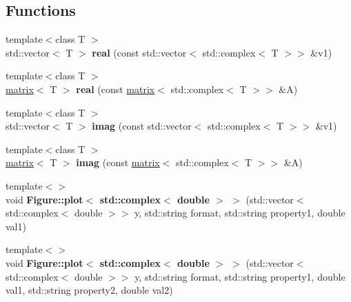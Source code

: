 \subsection*{Functions}
\begin{DoxyCompactItemize}
\item 
\hypertarget{namespacekeycpp_aa6ed5914a3c4b05e1e137fc9735e3ed5}{{\footnotesize template$<$class T $>$ }\\std\-::vector$<$ T $>$ {\bfseries real} (const std\-::vector$<$ std\-::complex$<$ T $>$$>$ \&v1)}\label{namespacekeycpp_aa6ed5914a3c4b05e1e137fc9735e3ed5}

\item 
\hypertarget{namespacekeycpp_a61efb014b42cd8b02a81b4520c41ab2c}{{\footnotesize template$<$class T $>$ }\\\hyperlink{classkeycpp_1_1matrix}{matrix}$<$ T $>$ {\bfseries real} (const \hyperlink{classkeycpp_1_1matrix}{matrix}$<$ std\-::complex$<$ T $>$$>$ \&A)}\label{namespacekeycpp_a61efb014b42cd8b02a81b4520c41ab2c}

\item 
\hypertarget{namespacekeycpp_af7a0afaf26071f5f60ff1c11a2f9a2a9}{{\footnotesize template$<$class T $>$ }\\std\-::vector$<$ T $>$ {\bfseries imag} (const std\-::vector$<$ std\-::complex$<$ T $>$$>$ \&v1)}\label{namespacekeycpp_af7a0afaf26071f5f60ff1c11a2f9a2a9}

\item 
\hypertarget{namespacekeycpp_ad902a14fdaa4b744a8a11220f5be0161}{{\footnotesize template$<$class T $>$ }\\\hyperlink{classkeycpp_1_1matrix}{matrix}$<$ T $>$ {\bfseries imag} (const \hyperlink{classkeycpp_1_1matrix}{matrix}$<$ std\-::complex$<$ T $>$$>$ \&A)}\label{namespacekeycpp_ad902a14fdaa4b744a8a11220f5be0161}

\item 
\hypertarget{namespacekeycpp_a27940c7f9c645f75b8feb3991f23b545}{{\footnotesize template$<$$>$ }\\void {\bfseries Figure\-::plot$<$ std\-::complex$<$ double $>$ $>$} (std\-::vector$<$ std\-::complex$<$ double $>$$>$ y, std\-::string format, std\-::string property1, double val1)}\label{namespacekeycpp_a27940c7f9c645f75b8feb3991f23b545}

\item 
\hypertarget{namespacekeycpp_ad033c29d2245437a52140ff3c46fa1d8}{{\footnotesize template$<$$>$ }\\void {\bfseries Figure\-::plot$<$ std\-::complex$<$ double $>$ $>$} (std\-::vector$<$ std\-::complex$<$ double $>$$>$ y, std\-::string format, std\-::string property1, double val1, std\-::string property2, double val2)}\label{namespacekeycpp_ad033c29d2245437a52140ff3c46fa1d8}


\end{DoxyCompactItemize}
